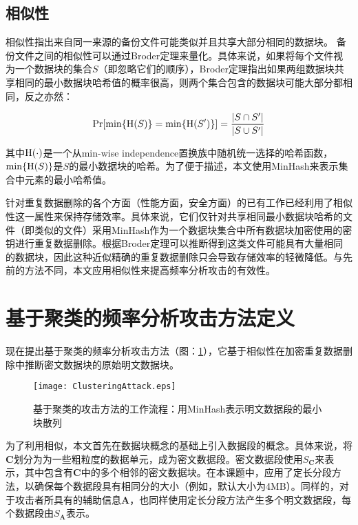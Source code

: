 \subsection{相似性}
相似性指出来自同一来源的备份文件可能类似并且共享大部分相同的数据块。 备份文件之间的相似性可以通过Broder定理来量化。具体来说，如果将每个文件视为一个数据块的集合$S$（即忽略它们的顺序），Broder定理指出如果两组数据块共享相同的最小数据块哈希值的概率很高，则两个集合包含的数据块可能大部分都相同，反之亦然：
 
\begin{eqnarray}
	\Pr[\min\{{\rm H}(S)\} = \min\{{\rm H}(S')\} ] = \frac{|S \cap S'|}{|S \cup S'|}
	\label{eq:similary}
\end{eqnarray}

其中${\rm H}(\cdot)$是一个从min-wise independence置换族中随机统一选择的哈希函数，$\min\{{\rm H}(S)\}$是$S$的最小数据块的哈希。为了便于描述，本文使用MinHash来表示集合中元素的最小哈希值。


针对重复数据删除的各个方面（性能方面，安全方面）的已有工作已经利用了相似性这一属性来保持存储效率。具体来说，它们仅针对共享相同最小数据块哈希的文件（即类似的文件）采用MinHash作为一个数据块集合中所有数据块加密使用的密钥进行重复数据删除。根据Broder定理可以推断得到这类文件可能具有大量相同的数据块，因此这种近似精确的重复数据删除只会导致存储效率的轻微降低。与先前的方法不同，本文应用相似性来提高频率分析攻击的有效性。
 
\section{基于聚类的频率分析攻击方法定义}
\label{sec:clustering-attack-description}

现在提出基于聚类的频率分析攻击方法（图：\ref{fig:基于聚类的攻击方法的工作流程}），它基于相似性在加密重复数据删除中推断密文数据块的原始明文数据块。

\begin{figure}[!htb]
    \small
    \centering
    \texttt{[image: ClusteringAttack.eps]}
    \caption{基于聚类的攻击方法的工作流程：用MinHash表示明文数据段的最小块散列} 
    \label{fig:基于聚类的攻击方法的工作流程}
\end{figure}

为了利用相似，本文首先在数据块概念的基础上引入数据段的概念。具体来说，将$\mathbf{C}$划分为为一些粗粒度的数据单元，成为密文数据段。密文数据段使用$S_\mathbf{C}$来表示，其中包含有$\mathbf{C}$中的多个相邻的密文数据块。在本课题中，应用了定长分段方法，以确保每个数据段具有相同分的大小（例如，默认大小为4MB）。同样的，对于攻击者所具有的辅助信息$\mathbf{A}$，也同样使用定长分段方法产生多个明文数据段，每个数据段由$S_\mathbf{A}$表示。

